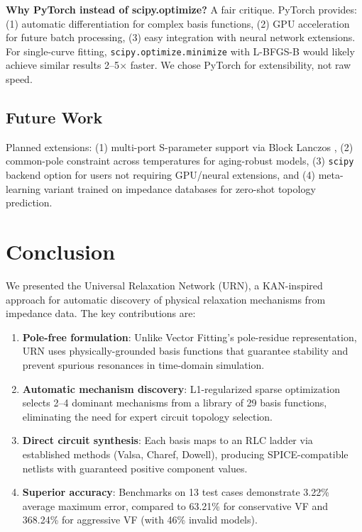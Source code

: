 \documentclass{ieeeaccess}
\begin{document}
\textbf{Why PyTorch instead of scipy.optimize?} A fair critique. PyTorch provides: (1) automatic differentiation for complex basis functions, (2) GPU acceleration for future batch processing, (3) easy integration with neural network extensions. For single-curve fitting, \texttt{scipy.optimize.minimize} with L-BFGS-B would likely achieve similar results 2--5$\times$ faster. We chose PyTorch for extensibility, not raw speed.

\subsection{Future Work}

Planned extensions: (1) multi-port S-parameter support via Block Lanczos \cite{odabasioglu1998prima}, (2) common-pole constraint across temperatures for aging-robust models, (3) \texttt{scipy} backend option for users not requiring GPU/neural extensions, and (4) meta-learning variant trained on impedance databases for zero-shot topology prediction.

\section{Conclusion}
\label{sec:conclusion}

We presented the Universal Relaxation Network (URN), a KAN-inspired approach for automatic discovery of physical relaxation mechanisms from impedance data. The key contributions are:

\begin{enumerate}
\item \textbf{Pole-free formulation}: Unlike Vector Fitting's pole-residue representation, URN uses physically-grounded basis functions that guarantee stability and prevent spurious resonances in time-domain simulation.

\item \textbf{Automatic mechanism discovery}: L1-regularized sparse optimization selects 2--4 dominant mechanisms from a library of 29 basis functions, eliminating the need for expert circuit topology selection.

\item \textbf{Direct circuit synthesis}: Each basis maps to an RLC ladder via established methods (Valsa, Charef, Dowell), producing SPICE-compatible netlists with guaranteed positive component values.

\item \textbf{Superior accuracy}: Benchmarks on 13 test cases demonstrate 3.22\% average maximum error, compared to 63.21\% for conservative VF and 368.24\% for aggressive VF (with 46\% invalid models).
\end{enumerate}
\end{document}
